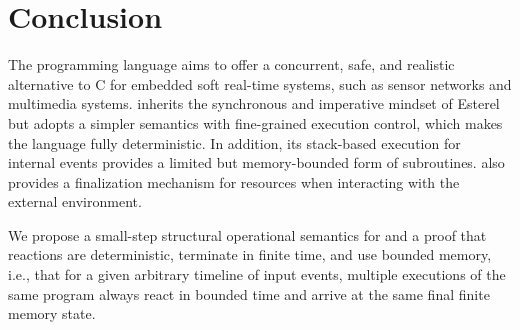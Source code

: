 \section{Conclusion}
\label{sec.conclusion}

The programming language \CEU aims to offer a concurrent, safe, and realistic
alternative to C for embedded soft real-time systems, such as sensor networks
and multimedia systems.
%
%
\CEU inherits the synchronous and imperative mindset of Esterel but adopts a
simpler semantics with fine-grained execution control, which makes the
language fully deterministic.
%
In addition, its stack-based execution for internal events provides a limited
but memory-bounded form of subroutines.
%
\CEU also provides a finalization mechanism for resources when interacting with
the external environment.

We propose a small-step structural operational semantics for \CEU and a proof
that reactions are deterministic, terminate in finite time, and use bounded
memory, i.e., that for a given arbitrary timeline of input events, multiple
executions of the same program always react in bounded time and arrive at the
same final finite memory state.
